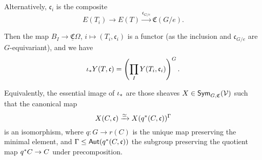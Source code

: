 \documentclass[a4paper,10pt
]{article}%
\newcommand{\UC}{\underline{\mathfrak C}}
\renewcommand{\1}{\ensuremath{\mathbb{id}}}
\begin{document}


{\color{blue} %
  Alternatively, $\mathfrak c_i$ is the composite
  \begin{equation}
        E(T_i) \to E(T) \xrightarrow{\mathfrak c_{G/e}} \mathfrak C(G/e).
  \end{equation}
} %

Then the map $B_I \to \UC\Omega$, $i \mapsto (T_i, \mathfrak c_i)$ is a functor
(as the inclusion {\color{blue} and $\mathfrak c_{G/e}$} are $G$-equivariant),
and we have
\begin{equation}
      \iota_{\**}Y(T, \mathfrak c) =
      \left(
            \prod_I Y(T_i, \mathfrak c_i)
      \right)^G.
\end{equation}



\begin{remark}[{cf. \cite[Rem 4.35]{BP17}}]
      Equivalently, the essential image of $\iota_{\**}$ are those sheaves $X \in \mathsf{Sym}_{G, \mathfrak C}(\mathcal V)$ such that
      the canonical map
      \begin{equation}
            X(C,\mathfrak c) \xrightarrow{\simeq} X(q^{\**}(C, \mathfrak c))^\Gamma
      \end{equation}
      is an isomorphism, where $q: G \to r(C)$ is the unique map preserving the minimal element, and
      $\Gamma \leq \mathsf{Aut}(q^{\**}(C,\mathfrak c))$ the subgroup preserving the quotient map $q^{\**}C \to C$
      under precomposition.
\end{remark}

\end{document}
